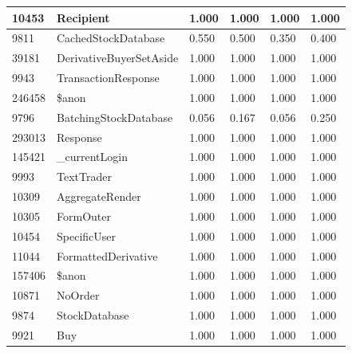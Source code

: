 \documentclass[a4paper]{article}
\newlength{\DUtablewidth} %
\begin{document}
\begin{longtable*}[c]{|p{0.160\DUtablewidth}|p{0.160\DUtablewidth}|p{0.160\DUtablewidth}|p{0.160\DUtablewidth}|p{0.160\DUtablewidth}|p{0.160\DUtablewidth}|}
10453
 & 
Recipient
 & 
1.000
 & 
1.000
 & 
1.000
 & 
1.000
 \\
\hline

9811
 & 
CachedStockDatabase
 & 
0.550
 & 
0.500
 & 
0.350
 & 
0.400
 \\
\hline

39181
 & 
DerivativeBuyerSetAside
 & 
1.000
 & 
1.000
 & 
1.000
 & 
1.000
 \\
\hline

9943
 & 
TransactionResponse
 & 
1.000
 & 
1.000
 & 
1.000
 & 
1.000
 \\
\hline

246458
 & 
\$anon
 & 
1.000
 & 
1.000
 & 
1.000
 & 
1.000
 \\
\hline

9796
 & 
BatchingStockDatabase
 & 
0.056
 & 
0.167
 & 
0.056
 & 
0.250
 \\
\hline

293013
 & 
Response
 & 
1.000
 & 
1.000
 & 
1.000
 & 
1.000
 \\
\hline

145421
 & 
\_currentLogin
 & 
1.000
 & 
1.000
 & 
1.000
 & 
1.000
 \\
\hline

9993
 & 
TextTrader
 & 
1.000
 & 
1.000
 & 
1.000
 & 
1.000
 \\
\hline

10309
 & 
AggregateRender
 & 
1.000
 & 
1.000
 & 
1.000
 & 
1.000
 \\
\hline

10305
 & 
FormOuter
 & 
1.000
 & 
1.000
 & 
1.000
 & 
1.000
 \\
\hline

10454
 & 
SpecificUser
 & 
1.000
 & 
1.000
 & 
1.000
 & 
1.000
 \\
\hline

11044
 & 
FormattedDerivative
 & 
1.000
 & 
1.000
 & 
1.000
 & 
1.000
 \\
\hline

157406
 & 
\$anon
 & 
1.000
 & 
1.000
 & 
1.000
 & 
1.000
 \\
\hline

10871
 & 
NoOrder
 & 
1.000
 & 
1.000
 & 
1.000
 & 
1.000
 \\
\hline

9874
 & 
StockDatabase
 & 
1.000
 & 
1.000
 & 
1.000
 & 
1.000
 \\
\hline

9921
 & 
Buy
 & 
1.000
 & 
1.000
 & 
1.000
 & 
1.000
 \\
\hline


\end{longtable*}
\end{document}
